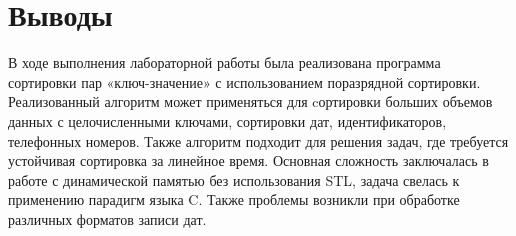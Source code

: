 \documentclass[12pt, a4paper]{article}
\begin{document}
\section{Выводы}

В ходе выполнения лабораторной работы была реализована программа сортировки пар «ключ-значение» с использованием поразрядной сортировки. Реализованный алгоритм может применяться для cортировки больших объемов данных с целочисленными ключами, сортировки дат, идентификаторов, телефонных номеров. Также алгоритм подходит для решения задач, где требуется устойчивая сортировка за линейное время. Основная сложность заключалась в работе с динамической памятью без использования STL, задача свелась к применению парадигм языка C. Также проблемы возникли при обработке различных форматов записи дат.
\end{document}
